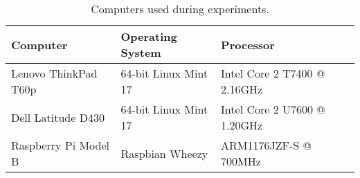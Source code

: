 \begin{table}[h]
  \begin{tabular}{lll}
  Computer                  & Operating System      & Processor                    \\ \hline
  Lenovo ThinkPad T60p      & 64-bit Linux Mint 17  & Intel Core 2 T7400 @ 2.16GHz \\ %
  Dell Latitude D430        & 64-bit Linux Mint 17  & Intel Core 2 U7600 @ 1.20GHz \\ %
  Raspberry Pi Model B      & Raspbian Wheezy       & ARM1176JZF-S @ 700MHz        \\ %
  \end{tabular}
  \caption{Computers used during experiments.}
  \label{tbl:target_computers}
\end{table}

